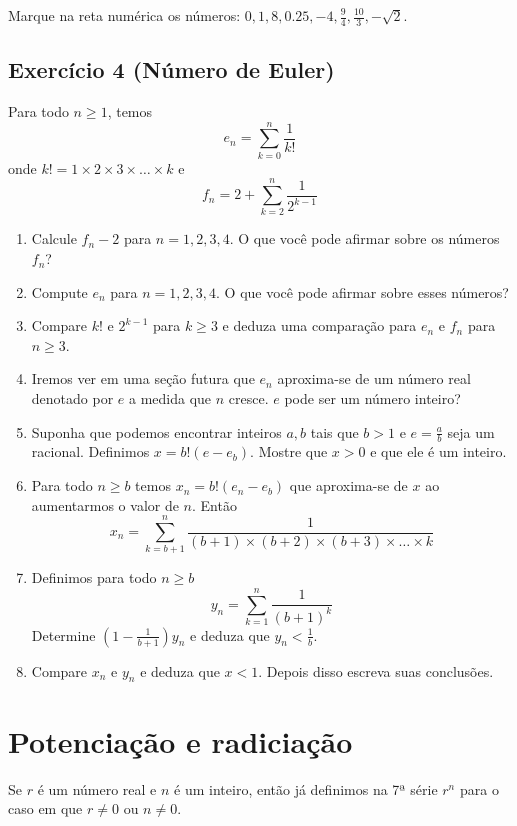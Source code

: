 Marque na reta numérica os números: $0, 1, 8,
0.25, -4, \frac{9}{4}, \frac{10}{3}, -\sqrt{2}$.

\subsection*{Exercício 4 (Número de Euler)}

Para todo $n \geq 1$, temos
$$e_n = \sum_{k=0}^{n} \frac{1}{k!}$$
onde $k! = 1 \times 2 \times 3 \times \ldots \times k$ e
$$f_n = 2 + \sum_{k=2}^{n} \frac{1}{2^{k-1}}$$

\begin{enumerate}
\item Calcule $f_n - 2$ para $n = 1, 2, 3, 4$.
  O que você pode afirmar sobre os números $f_n$?
\item Compute $e_n$ para $n = 1, 2, 3, 4$. O que você pode afirmar sobre esses
  números?
\item Compare $k!$ e $2^{k-1}$ para $k \geq 3$ e deduza uma comparação para
  $e_n$ e $f_n$ para $n \geq 3$.
\item Iremos ver em uma seção futura que $e_n$ aproxima-se de um número real
  denotado por $e$ a medida que $n$ cresce. $e$ pode ser um número inteiro?
\item Suponha que podemos encontrar inteiros $a,b$ tais que
  $b > 1$ e $e = \frac{a}{b}$ seja um racional. Definimos
  $x = b!\left(e - e_b\right)$. Mostre que $x > 0$ e que ele é um inteiro.
\item Para todo $n \geq b$ temos
  $x_n = b!\left(e_n - e_b\right)$ que aproxima-se de $x$ ao aumentarmos o valor
  de $n$. Então
  $$x_n = \sum_{k=b+1}^{n} \frac{1}{{(b+1)} \times {(b+2)} \times {(b+3)}
    \times \ldots \times k}$$
\item Definimos para todo $n \geq b$
  $$y_n = \sum_{k=1}^n \frac{1}{\left(b+1\right)^k}$$
  Determine $\left(1 - \frac{1}{b+1} \right) y_n$ e deduza que
  $y_n < \frac{1}{b}$.
\item Compare $x_n$ e $y_n$ e deduza que $x<1$. Depois disso escreva suas
  conclusões.
\end{enumerate}

\section{Potenciação e radiciação}

Se $r$ é um número real e $n$ é um inteiro, então já definimos na 7ª série $r^n$
para o caso em que $r \neq 0$ ou $n \neq 0$.

